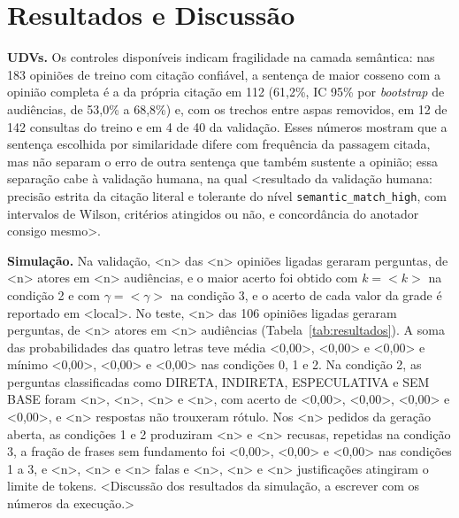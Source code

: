\section{Resultados e Discuss\~ao}
\label{sec:resultados}

\textbf{UDVs.} Os controles disponíveis indicam fragilidade na camada semântica: nas 183 opiniões de
treino com citação confiável, a sentença de maior cosseno com a opinião completa é a da própria
citação em 112 (61,2\%, IC 95\% por \textit{bootstrap} de audiências, de 53,0\% a 68,8\%) e, com os
trechos entre aspas removidos, em 12 de 142 consultas do treino e em 4 de 40 da validação. Esses
números mostram que a sentença escolhida por similaridade difere com frequência da passagem citada,
mas não separam o erro de outra sentença que também sustente a opinião; essa separação cabe à
validação humana, na qual <resultado da validação humana: precisão estrita da citação literal e
tolerante do nível \texttt{semantic\_match\_high}, com intervalos de Wilson, critérios atingidos ou
não, e concordância do anotador consigo mesmo>.

\textbf{Simulação.} Na validação, <n> das <n> opiniões ligadas geraram perguntas, de <n> atores em
<n> audiências, e o maior acerto foi obtido com $k = {<}k{>}$ na condição 2 e com
$\gamma = {<}\gamma{>}$ na condição 3, e o acerto de cada valor da grade é reportado em <local>. No
teste, <n> das 106 opiniões ligadas geraram perguntas, de <n> atores em <n> audiências
(Tabela~\ref{tab:resultados}). A soma das probabilidades das quatro letras teve média <0,00>, <0,00>
e <0,00> e mínimo <0,00>, <0,00> e <0,00> nas condições 0, 1 e 2. Na condição 2, as perguntas classificadas como
DIRETA, INDIRETA, ESPECULATIVA e SEM BASE foram <n>, <n>, <n> e <n>, com acerto de <0,00>, <0,00>,
<0,00> e <0,00>, e <n> respostas não trouxeram rótulo. Nos <n> pedidos da geração aberta, as condições
1 e 2 produziram <n> e <n> recusas, repetidas na condição 3, a fração de frases sem fundamento foi
<0,00>, <0,00> e <0,00> nas condições 1 a 3, e <n>, <n> e <n> falas e <n>, <n> e <n> justificações
atingiram o limite de tokens. <Discussão dos resultados da simulação, a escrever com os números da execução.>



